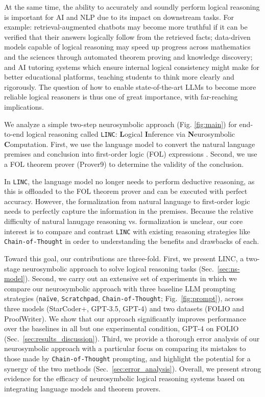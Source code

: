 \documentclass[11pt]{article}
\begin{document}
At the same time, the ability to accurately and soundly perform logical reasoning is important for AI and NLP due to its impact on downstream tasks. 
For example: retrieval-augmented chatbots may become more truthful if it can be verified that their answers logically follow from the retrieved facts;
data-driven models capable of logical reasoning may speed up progress across mathematics and the sciences through automated theorem proving and knowledge discovery;
and AI tutoring systems which ensure internal logical consistency might make for better educational platforms, teaching students to think more clearly and rigorously.
The question of how to enable state-of-the-art LLMs to become more reliable logical reasoners is thus one of great importance, with far-reaching implications.

We analyze a simple two-step neurosymbolic approach (Fig. \ref{fig:main}) for end-to-end logical reasoning called \texttt{LINC}: \textbf{L}ogical \textbf{I}nference via \textbf{N}eurosymbolic \textbf{C}omputation. First, we use the language model to convert the natural language premises and conclusion into first-order logic (FOL) expressions \cite{barwise2000language, enderton2001mathematical}. Second, we use a FOL theorem prover (Prover9) to determine the validity of the conclusion. 

In \texttt{LINC}, the language model no longer needs to perform deductive reasoning, as this is offloaded to the FOL theorem prover and can be executed with perfect accuracy. However, the formalization from natural language to first-order logic needs to perfectly capture the information in the premises. Because the relative difficulty of natural lanugage reasoning vs. formalization is unclear, our core interest is to compare and contrast \texttt{LINC} with existing reasoning strategies like \texttt{Chain-of-Thought} in order to understanding the benefits and drawbacks of each.

Toward this goal, our contributions are three-fold. First, we present LINC, a two-stage neurosymbolic approach to solve logical reasoning tasks (Sec.~\ref{sec:ns-model}). Second, we carry out an extensive set of experiments in which we compare our neurosymbolic approach with three baseline LLM prompting strategies (\texttt{na\"ive}, \texttt{Scratchpad}, \texttt{Chain-of-Thought}; Fig.~\ref{fig:prompt}), across three models (StarCoder+, GPT-3.5, GPT-4) and two datasets (FOLIO and ProofWriter). We show that our approach significantly improves performance over the baselines in all but one experimental condition, GPT-4 on FOLIO (Sec.~\ref{sec:results_discussion}). Third, we provide a thorough error analysis of our neurosymbolic approach with a particular focus on comparing its mistakes to those made by \texttt{Chain-of-Thought} prompting, and highlight the potential for a synergy of the two methods (Sec.~\ref{sec:error_analysis}). Overall, we present strong evidence for the efficacy of neurosymbolic logical reasoning systems based on integrating language models and theorem provers.
\end{document}
